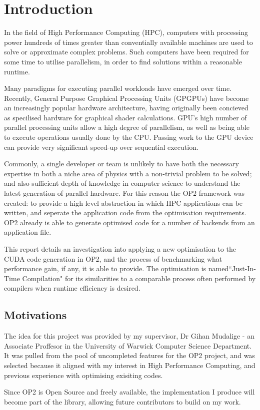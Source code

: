 
\section{Introduction}

In the field of High Performance Computing (HPC), computers with processing power hundreds of times greater than conventially available machines are used to solve or approximate complex problems. Such computers have been required for some time to utilise parallelism, in order to find solutions within a reasonable runtime.
\par Many paradigms for executing parallel workloads have emerged over time. Recently, General Purpose Graphical Processing Units (GPGPUs) have become an increasingly popular hardware architecture, having originally been concieved as specilised hardware for graphical shader calculations. GPU's high number of parallel processing units allow a high degree of parallelism, as well as being able to execute operations usually done by the CPU. Passing work to the GPU device can provide very significant speed-up over sequential execution.
\par
Commonly, a single developer or team is unlikely to have both the necessary expertise in both a niche area of physics with a non-trivial problem to be solved; and also sufficient depth of knowledge in computer science to understand the latest generation of parallel hardware. For this reason the OP2 framework was created: to provide a high level abstraction in which HPC applications can be written, and seperate the application code from the optimisation requirements. OP2 already is able to generate optimised code for a number of backends from an application file.
\par
This report details an investigation into applying a new optimisation to the CUDA code generation in OP2, and the process of benchmarking what performance gain, if any, it is able to provide.
The optimisation is named``Just-In-Time Compilation" for its similarities to a comparable process often performed by compilers when runtime efficiency is desired.
\vfill
\subsection{Motivations}
The idea for this project was provided by my supervisor, Dr Gihan Mudalige - an Associate Proffesor in the University of Warwick Computer Science Department. It was pulled from the pool of uncompleted features for the OP2 project, and was selected because it aligned with my interest in High Performance Computing, and previous experience with optimising exisiting codes.
\par
Since OP2 is Open Source and freely available, the implementation I produce will become part of the library, allowing future contributors to build on my work.

